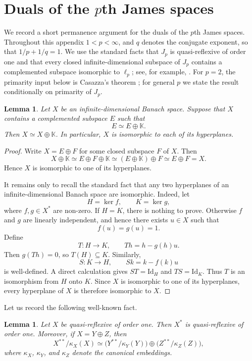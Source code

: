 \documentclass[11pt]{amsart}
\theoremstyle{plain}
\newtheorem{lemma}[theorem]{Lemma}
\theoremstyle{definition}
\numberwithin{equation}{section}
\newcommand{\Id}{\mathrm{Id}}
\begin{document}
\section{Duals of the $p$th James spaces}\label{app:Jp-dual-primary}

We record a short permanence argument for the duals of the $p$th James spaces.
Throughout this appendix $1<p<\infty$, and $q$ denotes the conjugate exponent, so that $1/p+1/q=1$.
We use the standard facts that $J_p$ is quasi-reflexive of order one and that every closed infinite-dimensional subspace of $J_p$ contains a complemented subspace isomorphic to $\ell_p$; see, for example, \cite[Remark~2.2, Proposition~2.3, and Section~2.6]{BirdLaustsen2010}.
For $p=2$, the primarity input below is Casazza's theorem \cite{Casazza1977}; for general $p$ we state the result conditionally on primarity of $J_p$.

\begin{lemma}\label{lem:complemented-copy-implies-hyperplanes}
Let $X$ be an infinite-dimensional Banach space. Suppose that $X$ contains a complemented subspace $E$ such that
\[
    E \simeq E\oplus \mathbb K .
\]
Then $X\simeq X\oplus \mathbb K$. In particular, $X$ is isomorphic to each of its hyperplanes.
\end{lemma}

\begin{proof}
Write $X=E\oplus F$ for some closed subspace $F$ of $X$. Then
\[
    X\oplus \mathbb K
        \simeq E\oplus F\oplus \mathbb K
        \simeq (E\oplus \mathbb K)\oplus F
        \simeq E\oplus F
        =X .
\]
Hence $X$ is isomorphic to one of its hyperplanes.

It remains only to recall the standard fact that any two hyperplanes of an infinite-dimensional Banach space are isomorphic. Indeed, let
\[
    H=\ker f,
    \qquad
    K=\ker g,
\]
where $f,g\in X^*$ are non-zero. If $H=K$, there is nothing to prove. Otherwise $f$ and $g$ are linearly independent, and hence there exists $u\in X$ such that
\[
    f(u)=g(u)=1.
\]
Define
\[
    T\colon H\to K,
    \qquad
    T h=h-g(h)u .
\]
Then $g(Th)=0$, so $T(H)\subseteq K$. Similarly,
\[
    S\colon K\to H,
    \qquad
    S k=k-f(k)u
\]
is well-defined. A direct calculation gives $ST=\Id_H$ and $TS=\Id_K$. Thus $T$ is an isomorphism from $H$ onto $K$.
Since $X$ is isomorphic to one of its hyperplanes, every hyperplane of $X$ is therefore isomorphic to $X$.
\end{proof}
Let us record the following well-known fact.
\begin{lemma}\label{lem:qref-one-dual-and-summands}
Let $X$ be quasi-reflexive of order one.
Then $X^*$ is quasi-reflexive of order one.
Moreover, if $X=Y\oplus Z$, then
\[
    X^{**}/\kappa_X(X)
        \simeq
    \bigl(Y^{**}/\kappa_Y(Y)\bigr)
        \oplus
    \bigl(Z^{**}/\kappa_Z(Z)\bigr),
\]
where $\kappa_X$, $\kappa_Y$, and $\kappa_Z$ denote the canonical embeddings.
\end{lemma}
\end{document}
